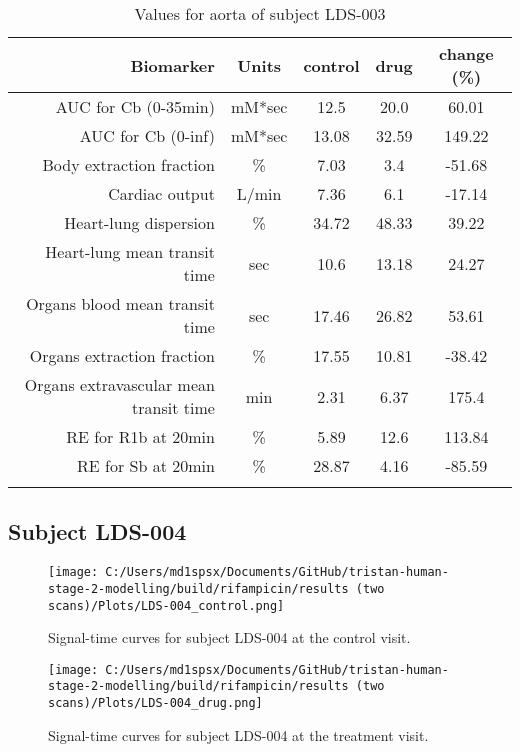\documentclass{epflreport}%
\begin{document}
\begin{longtable}{rcccc}%
\hline%
Biomarker&Units&control&drug&change (\%)\\%
\hline%
AUC for Cb (0{-}35min)&mM*sec&12.5&20.0&60.01\\%
AUC for Cb (0{-}inf)&mM*sec&13.08&32.59&149.22\\%
Body extraction fraction&\%&7.03&3.4&{-}51.68\\%
Cardiac output&L/min&7.36&6.1&{-}17.14\\%
Heart{-}lung dispersion&\%&34.72&48.33&39.22\\%
Heart{-}lung mean transit time&sec&10.6&13.18&24.27\\%
Organs blood mean transit time&sec&17.46&26.82&53.61\\%
Organs extraction fraction&\%&17.55&10.81&{-}38.42\\%
Organs extravascular mean transit time&min&2.31&6.37&175.4\\%
RE for R1b at 20min&\%&5.89&12.6&113.84\\%
RE for Sb at 20min&\%&28.87&4.16&{-}85.59\\%
\hline%
\caption{Values for aorta of subject LDS-003} \\%
\end{longtable}%
\clearpage%
\subsection{Subject LDS{-}004}%
\label{subsec:SubjectLDS{-}004}%

%


\begin{figure}[h!]%
\centering%
\texttt{[image: C:/Users/md1spsx/Documents/GitHub/tristan-human-stage-2-modelling/build/rifampicin/results (two scans)/Plots/LDS-004\_control.png]}%
\caption{Signal{-}time curves for subject LDS{-}004 at the control visit.}%
\end{figure}

%


\begin{figure}[h!]%
\centering%
\texttt{[image: C:/Users/md1spsx/Documents/GitHub/tristan-human-stage-2-modelling/build/rifampicin/results (two scans)/Plots/LDS-004\_drug.png]}%
\caption{Signal{-}time curves for subject LDS{-}004 at the treatment visit.}%
\end{figure}
\end{document}
